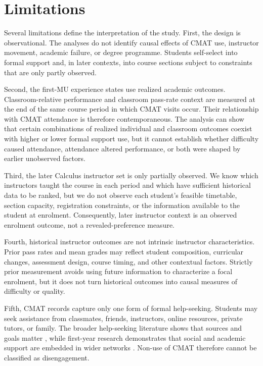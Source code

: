 \section{Limitations}

Several limitations define the interpretation of the study. First, the design is observational. The analyses do not identify causal effects of CMAT use, instructor movement, academic failure, or degree programme. Students self-select into formal support and, in later contexts, into course sections subject to constraints that are only partly observed.

Second, the first-MU experience states use realized academic outcomes. Classroom-relative performance and classroom pass-rate context are measured at the end of the same course period in which CMAT visits occur. Their relationship with CMAT attendance is therefore contemporaneous. The analysis can show that certain combinations of realized individual and classroom outcomes coexist with higher or lower formal support use, but it cannot establish whether difficulty caused attendance, attendance altered performance, or both were shaped by earlier unobserved factors.

Third, the later Calculus instructor set is only partially observed. We know which instructors taught the course in each period and which have sufficient historical data to be ranked, but we do not observe each student's feasible timetable, section capacity, registration constraints, or the information available to the student at enrolment. Consequently, later instructor context is an observed enrolment outcome, not a revealed-preference measure.

Fourth, historical instructor outcomes are not intrinsic instructor characteristics. Prior pass rates and mean grades may reflect student composition, curricular changes, assessment design, course timing, and other contextual factors. Strictly prior measurement avoids using future information to characterize a focal enrolment, but it does not turn historical outcomes into causal measures of difficulty or quality.

Fifth, CMAT records capture only one form of formal help-seeking. Students may seek assistance from classmates, friends, instructors, online resources, private tutors, or family. The broader help-seeking literature shows that sources and goals matter \citep{fong2023}, while first-year research demonstrates that social and academic support are embedded in wider networks \citep{wilcox2005}. Non-use of CMAT therefore cannot be classified as disengagement.

